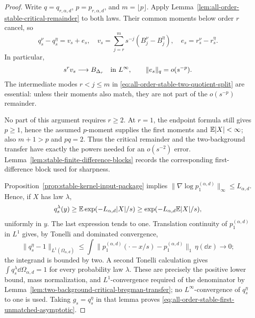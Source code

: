 \begin{proof}
Write \(q=q_{r,\alpha,d}\), \(p=p_{r,\alpha,d}\), and
\(m=\lfloor p\rfloor\).  Apply
Lemma~\ref{lem:all-order-stable-critical-remainder} to both laws.  Their
common moments below order \(r\) cancel, so
\begin{equation}\label{eq:all-order-stable-two-quotient-split}
 q_s^\nu-q_s^\eta=v_s+e_s,
 \quad
 v_s=\sum_{j=r}^m s^{-j}(B_j^\nu-B_j^\eta),
 \quad
 e_s=r_s^\nu-r_s^\eta.
\end{equation}
In particular,
\[
 s^rv_s\longrightarrow B_{\Delta_r}\quad\hbox{in }L^\infty,
 \qquad \|e_s\|_q=o(s^{-p}).
\]
The intermediate modes \(r<j\le m\) in
\eqref{eq:all-order-stable-two-quotient-split} are essential: unless their
moments also match, they are not part of the \(o(s^{-p})\) remainder.

No part of this argument requires \(r\ge2\).  At \(r=1\), the endpoint
formula still gives \(p\ge1\), hence the assumed \(p\)-moment supplies the
first moments and \(\mathbb{E}|X|<\infty\); also \(m+1>p\) and \(pq=2\).  Thus the
critical remainder and the two-background transfer have exactly the powers
needed for an \(o(s^{-2})\) error.  Lemma~\ref{lem:stable-finite-difference-blocks}
records the corresponding first-difference block used for sharpness.

Proposition~\ref{prop:stable-kernel-input-package} implies
\(\|\nabla\log p_1^{(\alpha,d)}\|_\infty\le L_{\alpha,d}\).  Hence, if
\(X\) has law \(\lambda\),
\[
 q_s^\lambda(y)
 \ge\mathbb{E}\exp(-L_{\alpha,d}|X|/s)
 \ge\exp(-L_{\alpha,d}\mathbb{E}|X|/s),
\]
uniformly in \(y\).  The last expression tends to one.  Translation
continuity of \(p_1^{(\alpha,d)}\) in \(L^1\) gives, by Tonelli and dominated
convergence,
\[
 \|q_s^\eta-1\|_{L^1(\Omega_{\alpha,d})}
 \le\int\|p_1^{(\alpha,d)}(\mathord\cdot-x/s)
              -p_1^{(\alpha,d)}\|_1\,\eta(\dd x)\longrightarrow0;
\]
the integrand is bounded by two.  A second Tonelli calculation gives
\(\int q_s^\lambda\dd\Omega_{\alpha,d}=1\) for every probability law
\(\lambda\).  These are precisely the positive lower bound, mass
normalization, and \(L^1\)-convergence required of the denominator by
Lemma~\ref{lem:two-background-critical-bregman-transfer}; no
\(L^\infty\)-convergence of \(q_s^\eta\) to one is used.  Taking
\(g_s=q_s^\eta\) in that lemma proves
\eqref{eq:all-order-stable-first-unmatched-asymptotic}.


\end{proof}
